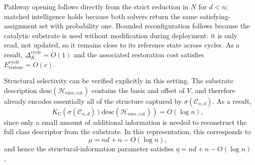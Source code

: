 \documentclass[runningheads]{llncs}
\newcommand{\Erasure}{c}
\newcommand{\Nop}{N}
\newcommand{\Hw}{\mathcal{H}}
\newcommand{\Class}{\mathcal{C}}
\newcommand{\descop}{\mathrm{desc}}
\newcommand{\Erestore}{E_{\mathrm{restore}}^{\mathrm{cycle}}}
\begin{document}
Pathway opening follows directly from the strict reduction in
$\Nop$ for $d<n$; matched intelligence holds because both solvers
return the same satisfying-assignment set with probability one. Bounded
reconfiguration follows because the catalytic substrate is used
without modification during deployment: it is only read, not
updated, so it remains close to its reference state across cycles.
As a result, $\Delta_K^{\mathrm{cycle}}=O(1)$ and the associated
restoration cost satisfies $\Erestore=O(\Erasure)$.

Structural selectivity can be verified explicitly in this setting.
The substrate description $\descop(\Hw_{\mathrm{exec,cat}})$
contains the basis and offset of $V$, and therefore already
encodes essentially all of the structure captured by
$\sigma(\Class_{n,d})$. As a result,
\[
K_U(\sigma(\Class_{n,d})\mid\descop(\Hw_{\mathrm{exec,cat}}))
=O(\log n),
\]
since only a small amount of additional information is needed to
reconstruct the full class descriptor from the substrate. In this representation, this corresponds to
\[
\mu=n d+n-O(\log n),
\]
and hence the structural-information parameter satisfies
$\eta=n d+n-O(\log n)$.
\end{document}
